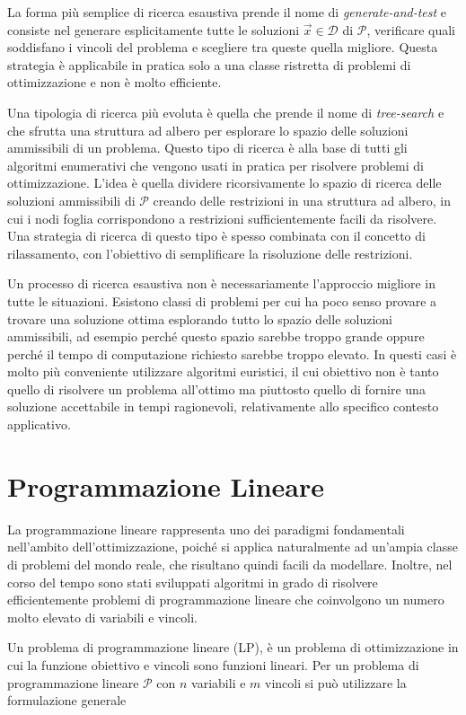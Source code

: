La forma più semplice di ricerca esaustiva prende il nome di
\textit{generate-and-test} e consiste nel generare esplicitamente tutte le
soluzioni $\vec{x} \in \mathcal{D}$ di $\mathcal{P}$, verificare quali
soddisfano i vincoli del problema e scegliere tra queste quella migliore.
Questa strategia è applicabile in pratica solo a una classe ristretta di
problemi di ottimizzazione e non è molto efficiente.

Una tipologia di ricerca più evoluta è quella che prende il nome di
\textit{tree-search} e che sfrutta una struttura ad albero per esplorare lo
spazio delle soluzioni ammissibili di un problema. Questo tipo di ricerca è
alla base di tutti gli algoritmi enumerativi che vengono usati in pratica
per risolvere problemi di ottimizzazione. L'idea è quella dividere
ricorsivamente lo spazio di ricerca delle soluzioni ammissibili di
$\mathcal{P}$ creando delle restrizioni in una struttura ad albero, in cui
i nodi foglia corrispondono a restrizioni sufficientemente facili da
risolvere. Una strategia di ricerca di questo tipo è spesso combinata con
il concetto di rilassamento, con l'obiettivo di semplificare la risoluzione
delle restrizioni.

Un processo di ricerca esaustiva non è necessariamente l'approccio migliore
in tutte le situazioni. Esistono classi di problemi per cui ha poco senso
provare a trovare una soluzione ottima esplorando tutto lo spazio delle
soluzioni ammissibili, ad esempio perché questo spazio sarebbe troppo
grande oppure perché il tempo di computazione richiesto sarebbe troppo
elevato.  In questi casi è molto più conveniente utilizzare algoritmi
euristici, il cui obiettivo non è tanto quello di risolvere un  problema
all'ottimo ma piuttosto quello di fornire una soluzione accettabile in
tempi ragionevoli, relativamente allo specifico contesto applicativo.

\section{Programmazione Lineare}
La programmazione lineare rappresenta uno dei paradigmi fondamentali
nell'ambito dell'ottimizzazione, poiché si applica naturalmente ad un'ampia
classe di problemi del mondo reale, che risultano quindi facili da
modellare. Inoltre, nel corso del tempo sono stati sviluppati algoritmi in
grado di risolvere efficientemente problemi di programmazione lineare che
coinvolgono un numero molto elevato di variabili e vincoli.

Un problema di programmazione lineare (LP), è un problema di ottimizzazione
in cui la funzione obiettivo e vincoli sono funzioni lineari. Per un problema
di programmazione lineare $\mathcal{P}$ con $n$ variabili e $m$ vincoli si
può utilizzare la formulazione generale

